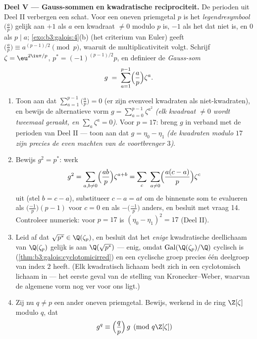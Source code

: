 \begin{problem}
\medskip
\noindent\textbf{Deel V --- Gauss-sommen en kwadratische
reciprociteit.} De perioden uit Deel II verbergen een schat. Voor
een oneven priemgetal $p$ is het \emph{legendresymbool}
$\bigl(\frac ap\bigr)$ gelijk aan $+1$ als $a$ een kwadraat $\neq
0$ modulo $p$ is, $-1$ als het dat niet is, en $0$ als $p \mid
a$; \cref{exo:b3:galois:4}(b) (het criterium van Euler) geeft
$\bigl(\frac ap\bigr) \equiv a^{(p-1)/2} \pmod p$, waaruit de
multiplicativiteit volgt. Schrijf $\zeta = \eu^{2\iu\pi/p}$, $p^*
= (-1)^{(p-1)/2}p$, en definieer de \emph{Gauss-som}
\[
g \;=\; \sum_{a=1}^{p-1}\Bigl(\frac ap\Bigr)\zeta^a .
\]
\begin{enumerate}[resume]
  \item Toon aan dat $\sum_{a=1}^{p-1}\bigl(\frac ap\bigr) = 0$
        (er zijn evenveel kwadraten als niet-kwadraten), en bewijs
        de alternatieve vorm $g = \sum_{a=0}^{p-1}\zeta^{a^2}$
        \emph{(elk kwadraat $\neq 0$ wordt tweemaal geraakt, en
        $\sum_{a}\zeta^a = 0$)}. Voor $p = 17$: breng $g$ in
        verband met de perioden van Deel II --- toon aan dat $g =
        \eta_0 - \eta_1$ \emph{(de kwadraten modulo $17$ zijn
        precies de even machten van de voortbrenger $3$)}.
  \item Bewijs $g^2 = p^*$: werk
        \[
        g^2 = \sum_{a,b\neq0}\Bigl(\frac{ab}p\Bigr)
        \zeta^{a+b}
        = \sum_{c}\ \sum_{a \neq 0}\Bigl(\frac{a(c -
        a)}p\Bigr)\zeta^{c}
        \]
        uit (stel $b = c - a$), substitueer $c - a = at$ om de
        binnenste som te evalueren als $\bigl(\frac{-1}p\bigr)(p -
        1)$ voor $c = 0$ en als $-\bigl(\frac{-1}p\bigr)$ anders,
        en besluit met vraag 14. Controleer numeriek: voor $p =
        17$ is $(\eta_0 - \eta_1)^2 = 17$ (Deel II).
  \item Leid af dat $\sqrt{p^*} \in \Q(\zeta_p)$, en besluit dat
        het \emph{enige} kwadratische deellichaam van
        $\Q(\zeta_p)$ gelijk is aan $\Q(\sqrt{p^*})$ --- enig,
        omdat $\operatorname{Gal}(\Q(\zeta_p)/\Q)$ cyclisch is
        (\cref{thm:b3:galois:cyclotomicirred}) en een cyclische
        groep precies één deelgroep van index $2$ heeft. (Elk
        kwadratisch lichaam bedt zich in een cyclotomisch lichaam
        in --- het eerste geval van de stelling van
        Kronecker--Weber, waarvan de algemene vorm nog ver voor
        ons ligt.)
  \item Zij nu $q \neq p$ een ander oneven priemgetal. Bewijs,
        werkend in de ring $\Z[\zeta]$ modulo $q$, dat
        \[
        g^q \equiv \Bigl(\frac qp\Bigr)\,g \pmod{q\Z[\zeta]}
\]
\end{enumerate}
\end{problem}
